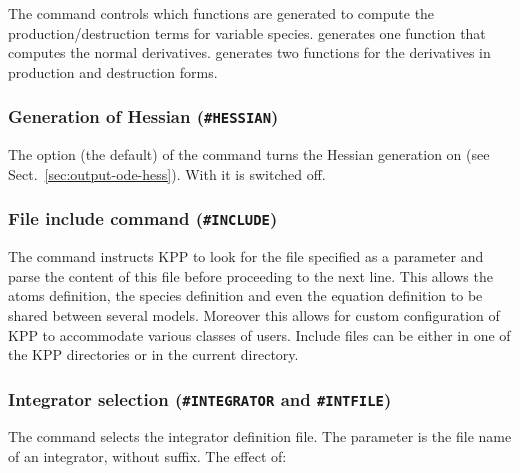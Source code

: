 \documentclass[twoside]{article}
\begin{document}
The  command controls which functions are generated to
compute the production/destruction terms for variable species.
 generates one function that computes the normal
derivatives.  generates two functions for the derivatives in
production and destruction forms.

\subsubsection{Generation of Hessian ({\tt\#HESSIAN})}
\label{sec:command-hessian}

The option  (the default) of the  command turns
the Hessian generation on (see Sect.~\ref{sec:output-ode-hess}). With
 it is switched off.

\subsubsection{File include command ({\tt\#INCLUDE})}
\label{sec:command-include}

The  command instructs KPP to look for the file specified
as a parameter and parse the content of this file before proceeding to
the next line. This allows the atoms definition, the species definition
and even the equation definition to be shared between several models.
Moreover this allows for custom configuration of KPP to accommodate
various classes of users. Include files can be either in one of the KPP
directories or in the current directory.

\subsubsection{Integrator selection ({\tt\#INTEGRATOR} and
  {\tt\#INTFILE})}
\label{sec:command-integrator-intfile}

The  command selects the integrator definition file.
The parameter is the file name of an integrator, without suffix. The
effect of:
\end{document}
